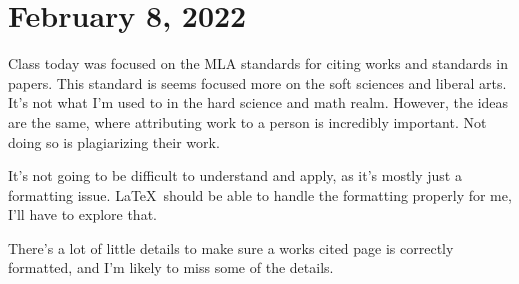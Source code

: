 \documentclass[journal.tex]{subfiles}
\begin{document}
\pagebreak
\section*{February 8, 2022}

Class today was focused on the MLA standards for citing works and standards in papers.
This standard is seems focused more on the soft sciences and liberal arts.
It's not what I'm used to in the hard science and math realm.
However, the ideas are the same, where attributing work to a person is incredibly important.
Not doing so is plagiarizing their work.

It's not going to be difficult to understand and apply, as it's mostly just a formatting issue.
\LaTeX\ should be able to handle the formatting properly for me, I'll have to explore that.

There's a lot of little details to make sure a works cited page is correctly formatted, and I'm likely to miss some of the details.
\end{document}

